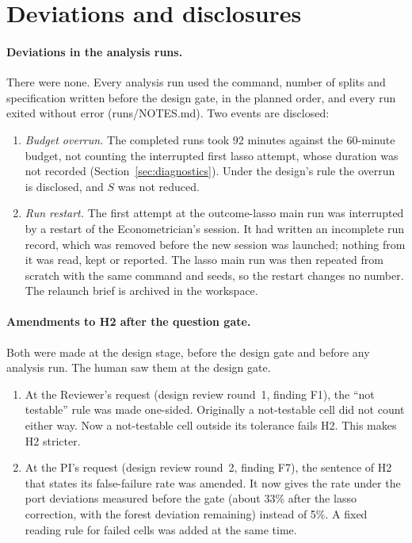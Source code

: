 \documentclass[11pt]{article}
\begin{document}
\section{Deviations and disclosures}
\label{sec:deviations}

\paragraph{Deviations in the analysis runs.} There were none. Every analysis run used
the command, number of splits and specification written before the design gate, in the
planned order, and every run exited without error (runs/NOTES.md). Two events are
disclosed:
\begin{enumerate}
  \item \emph{Budget overrun.} The completed runs took 92 minutes against the 60-minute
        budget, not counting the interrupted first lasso attempt, whose duration was not
        recorded (Section~\ref{sec:diagnostics}). Under the design's rule the overrun is disclosed,
        and $S$ was not reduced.
  \item \emph{Run restart.} The first attempt at the outcome-lasso main run was interrupted
        by a restart of the Econometrician's session. It had written an incomplete run
        record, which was removed before the new session was launched; nothing from it was
        read, kept or reported. The lasso main run was then repeated from scratch with the
        same command and seeds, so the restart changes no number. The relaunch brief is
        archived in the workspace.
\end{enumerate}

\paragraph{Amendments to H2 after the question gate.} Both were made at the design stage,
before the design gate and before any analysis run. The human saw them at the design
gate.
\begin{enumerate}
  \item At the Reviewer's request (design review round~1, finding F1), the
        ``not testable'' rule was made one-sided. Originally a not-testable cell did not
        count either way. Now a not-testable cell outside its tolerance fails H2. This makes
        H2 stricter.
  \item At the PI's request (design review round~2, finding F7), the sentence of H2 that
        states its false-failure rate was amended. It now gives the rate under the port
        deviations measured before the gate (about 33\% after the lasso correction, with
        the forest deviation remaining) instead of 5\%. A fixed reading rule for failed
        cells was added at the same time.
\end{enumerate}
\end{document}
